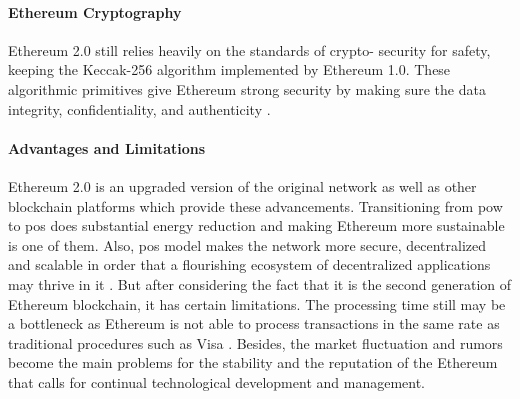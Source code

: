 \paragraph{Ethereum Cryptography}

Ethereum 2.0 still relies heavily on the standards of crypto- security for safety, keeping the Keccak-256 algorithm implemented by Ethereum 1.0. These 
algorithmic primitives give Ethereum strong security by making sure the data integrity, confidentiality, and authenticity \cite{9129332}.

\paragraph{Advantages and Limitations}

Ethereum 2.0 is an upgraded version of the original network as well as other blockchain platforms which provide these advancements. Transitioning from \gls{pow} to 
\gls{pos} does substantial energy reduction and making Ethereum more sustainable is one of them. Also, \gls{pos} model makes the network more secure, decentralized and 
scalable in order that a flourishing ecosystem of decentralized applications may thrive in it \cite{ethereumpos}. But after considering the fact that it is the second generation 
of Ethereum blockchain, it has certain limitations. The processing time still may be a bottleneck as Ethereum is not able to process transactions in the same 
rate as traditional procedures such as Visa \cite{9129332}. Besides, the market fluctuation and rumors become the main problems for the stability and the reputation of the 
Ethereum that calls for continual technological development and management.